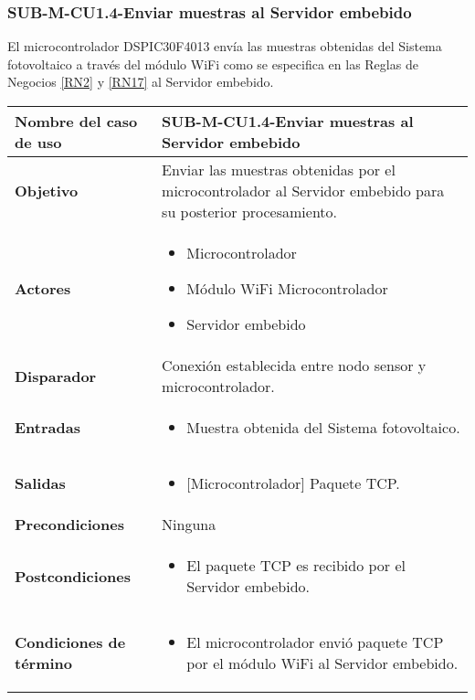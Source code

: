 \subsubsection{SUB-M-CU1.4-Enviar muestras al Servidor embebido}\label{SUB-M-CU1.4}
El microcontrolador DSPIC30F4013 envía las muestras obtenidas del Sistema fotovoltaico a través del módulo WiFi como se especifica en las Reglas de Negocios \ref{RN2} y \ref{RN17} al Servidor embebido.
\begin{longtable}{|J{5cm}|J{10.3cm}|}
	\hline
	\textbf{Nombre del caso de uso} &
		SUB-M-CU1.4-Enviar muestras al Servidor embebido \\ \hline
	\textbf{Objetivo} &
		Enviar las muestras obtenidas por el microcontrolador al Servidor embebido para su posterior procesamiento. \\ \hline
	\textbf{Actores} &
	    \begin{itemize}
		    \item Microcontrolador
		    \item Módulo WiFi Microcontrolador
		    \item Servidor embebido
		\end{itemize}\\ \hline 
	\textbf{Disparador} & 
		Conexión establecida entre nodo sensor y microcontrolador.\\ \hline
	\textbf{Entradas} & %
		\begin{itemize}%
				\item Muestra obtenida del Sistema fotovoltaico.
		\end{itemize}
		\\ \hline 
	\textbf{Salidas} & 
	    \begin{itemize}%
	        \item {[Microcontrolador]} Paquete TCP.
	    \end{itemize}\\ \hline
	\textbf{Precondiciones} & Ninguna
		\\ \hline
	\textbf{Postcondiciones} &
		\begin{itemize}
			\item El paquete TCP es recibido por el Servidor embebido.
		\end{itemize} \\ \hline
	\textbf{Condiciones de término} & 
		\begin{itemize}
		    \item El microcontrolador envió paquete TCP por el módulo WiFi al Servidor embebido.

\end{itemize}
\end{longtable}
